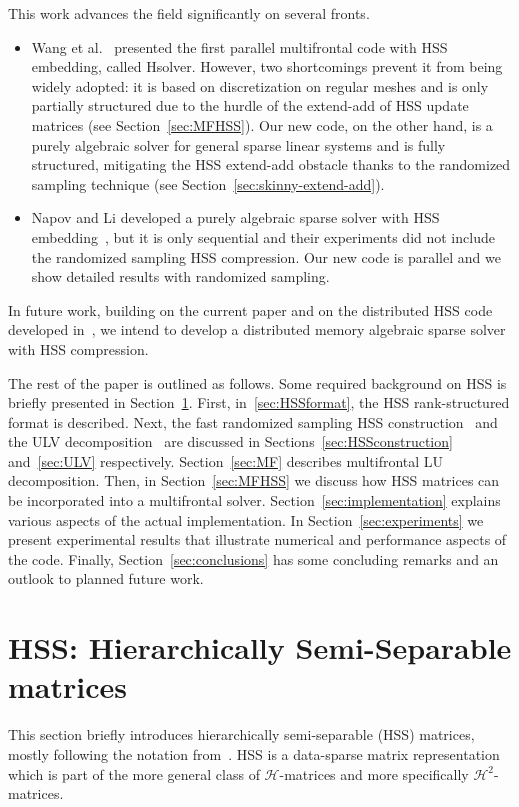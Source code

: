 \documentclass{article}
\begin{document}
This work advances the field significantly on several fronts.
\begin{itemize}
\item Wang et al.~\cite{wang2014parallel} presented the first parallel
  multifrontal code with HSS embedding, called Hsolver. However, two
  shortcomings prevent it from being widely adopted: it is based on
  discretization on regular meshes and is only partially structured
  due to the hurdle of the extend-add of HSS update matrices (see
  Section~\ref{sec:MFHSS}).  Our new code, on the other hand, is a
  purely algebraic solver for general sparse linear systems and is
  fully structured, mitigating the HSS extend-add obstacle thanks to
  the randomized sampling technique (see
  Section~\ref{sec:skinny-extend-add}).
\item 
Napov and Li developed a purely algebraic sparse solver with HSS
  embedding~\cite{napov2013algebraic}, but it is only sequential and
  their experiments did not include the randomized sampling HSS
  compression.  Our new code is parallel and we show detailed results
  with randomized sampling.
\end{itemize}
In future work, building on the current paper and on the distributed
HSS code developed in~\cite{FHR}, we intend to develop a distributed
memory algebraic sparse solver with HSS compression.

The rest of the paper is outlined as follows.  Some required
background on HSS is briefly presented in
Section~\ref{sec:HSS}. First, in~\ref{sec:HSSformat}, the HSS
rank-structured format is described. Next, the fast randomized
sampling HSS construction~\cite{martinsson2011fast} and the ULV
decomposition~\cite{xia2012superfast} are discussed in
Sections~\ref{sec:HSSconstruction} and~\ref{sec:ULV} respectively.
Section~\ref{sec:MF} describes multifrontal LU decomposition. Then, in
Section~\ref{sec:MFHSS} we discuss how HSS matrices can be
incorporated into a multifrontal
solver. Section~\ref{sec:implementation} explains various aspects of
the actual implementation. In Section~\ref{sec:experiments} we present
experimental results that illustrate numerical and performance aspects
of the code. Finally, Section~\ref{sec:conclusions} has some
concluding remarks and an outlook to planned future work.


\section{HSS: Hierarchically Semi-Separable matrices}\label{sec:HSS}
This section briefly introduces hierarchically semi-separable (HSS)
matrices, mostly following the notation
from~\cite{martinsson2011fast}. HSS is a data-sparse matrix
representation which is part of the more general class of
$\mathcal{H}$-matrices and more specifically $\mathcal{H}^2$-matrices.
\end{document}
